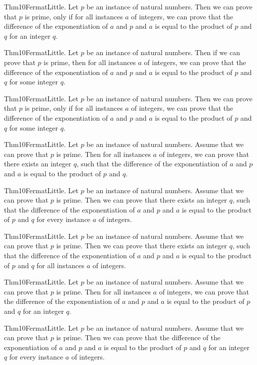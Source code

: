 \documentclass{article}
\begin{document}
Thm10FermatLittle. Let $p$ be an instance of natural numbers. Then we can prove that $p$ is prime, only if for all instances $a$ of integers, we can prove that the difference of the exponentiation of $a$ and $p$ and $a$ is equal to the product of $p$ and $q$ for an integer $q$.

Thm10FermatLittle. Let $p$ be an instance of natural numbers. Then if we can prove that $p$ is prime, then for all instances $a$ of integers, we can prove that the difference of the exponentiation of $a$ and $p$ and $a$ is equal to the product of $p$ and $q$ for some integer $q$.

Thm10FermatLittle. Let $p$ be an instance of natural numbers. Then we can prove that $p$ is prime, only if for all instances $a$ of integers, we can prove that the difference of the exponentiation of $a$ and $p$ and $a$ is equal to the product of $p$ and $q$ for some integer $q$.

Thm10FermatLittle. Let $p$ be an instance of natural numbers. Assume that we can prove that $p$ is prime. Then for all instances $a$ of integers, we can prove that there exists an integer $q$, such that the difference of the exponentiation of $a$ and $p$ and $a$ is equal to the product of $p$ and $q$.

Thm10FermatLittle. Let $p$ be an instance of natural numbers. Assume that we can prove that $p$ is prime. Then we can prove that there exists an integer $q$, such that the difference of the exponentiation of $a$ and $p$ and $a$ is equal to the product of $p$ and $q$ for every instance $a$ of integers.

Thm10FermatLittle. Let $p$ be an instance of natural numbers. Assume that we can prove that $p$ is prime. Then we can prove that there exists an integer $q$, such that the difference of the exponentiation of $a$ and $p$ and $a$ is equal to the product of $p$ and $q$ for all instances $a$ of integers.

Thm10FermatLittle. Let $p$ be an instance of natural numbers. Assume that we can prove that $p$ is prime. Then for all instances $a$ of integers, we can prove that the difference of the exponentiation of $a$ and $p$ and $a$ is equal to the product of $p$ and $q$ for an integer $q$.

Thm10FermatLittle. Let $p$ be an instance of natural numbers. Assume that we can prove that $p$ is prime. Then we can prove that the difference of the exponentiation of $a$ and $p$ and $a$ is equal to the product of $p$ and $q$ for an integer $q$ for every instance $a$ of integers.
\end{document}
